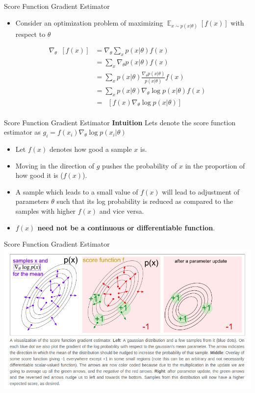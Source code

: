 \begin{frame}{Score Function Gradient Estimator}
\begin{itemize}
    \item Consider an optimization problem of maximizing $\mathop{\mathbb{E}}_{x \sim p(x|\theta)}[f(x)]$ with respect to $\theta$
\end{itemize}
\begin{equation}
    \begin{split}
            \nabla_{\theta}\mathop{\mathbb{E}_x}[f(x)] & = \nabla_{\theta} \sum_x p(x|\theta)f(x)\\
    & = \sum_x \nabla_{\theta}p(x|\theta)f(x)\\
    & = \sum_x p(x|\theta)\frac{\nabla_{\theta}p(x|\theta)}{p(x|\theta)}f(x)\\
    & = \sum_x p(x|\theta)\nabla_{\theta}\log p(x|\theta)f(x)\\
    & = \mathop{\mathbb{E}_x}[f(x) \nabla_{\theta}\log p(x|\theta)]\\
    \end{split}
\end{equation}
    
\end{frame}
\begin{frame}{Score Function Gradient Estimator}
\textbf{Intuition}
\newline 
Lets denote the score function estimator as $g_i = f(x_i)\nabla_{\theta} \log p(x_i|\theta)$
\begin{itemize}
    \item Let $f(x)$ denotes how good a sample $x$ is.
    \item Moving in the direction of $g$ pushes the probability of $x$ in the proportion of how good it is ($f(x)$).
    \item A sample which leads to a small value of $f(x)$ will lead to adjustment of parameters $\theta$ such that its log probability is reduced as compared to the samples with higher $f(x)$ and vice versa.
    \item  \textbf{$f(x)$ need not be a continuous or differentiable function}.
\end{itemize}
    
\end{frame}
\begin{frame}{Score Function Gradient Estimator}
\includegraphics[scale = 0.4]{img/scoreFunction.png}
\end{frame}
